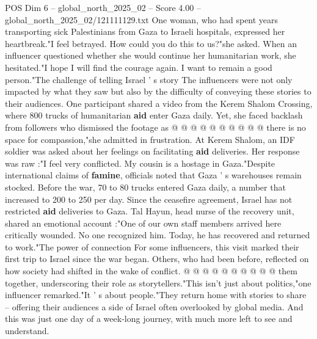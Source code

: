 \begin{textsample}{POS Dim 6 – global\_north\_2025\_02 – Score 4.00 – global\_north\_2025\_02/121111129.txt}
One woman, who had spent years transporting sick Palestinians from Gaza to Israeli hospitals, expressed her heartbreak."I feel betrayed.
How could you do this to us?"she asked.
When an influencer questioned whether she would continue her humanitarian work, she hesitated."I hope I will find the courage again.
I want to remain a good person."The challenge of telling Israel ' s story The influencers were not only impacted by what they saw but also by the difficulty of conveying these stories to their audiences.
One participant shared a video from the Kerem Shalom Crossing, where 800 trucks of humanitarian \textbf{aid} enter Gaza daily.
Yet, she faced backlash from followers who dismissed the footage as @ @ @ @ @ @ @ @ @ @ there is no space for compassion,"she admitted in frustration.
At Kerem Shalom, an IDF soldier was asked about her feelings on facilitating \textbf{aid} deliveries.
Her response was raw :"I feel very conflicted.
My cousin is a hostage in Gaza."Despite international claims of \textbf{famine}, officials noted that Gaza ' s warehouses remain stocked.
Before the war, 70 to 80 trucks entered Gaza daily, a number that increased to 200 to 250 per day.
Since the ceasefire agreement, Israel has not restricted \textbf{aid} deliveries to Gaza.
Tal Hayun, head nurse of the recovery unit, shared an emotional account :"One of our own staff members arrived here critically wounded.
No one recognized him.
Today, he has recovered and returned to work."The power of connection For some influencers, this visit marked their first trip to Israel since the war began.
Others, who had been before, reflected on how society had shifted in the wake of conflict. @ @ @ @ @ @ @ @ @ @ them together, underscoring their role as storytellers."This isn't just about politics,"one influencer remarked."It ' s about people."They return home with stories to share -- offering their audiences a side of Israel often overlooked by global media.
And this was just one day of a week-long journey, with much more left to see and understand.

\end{textsample}
